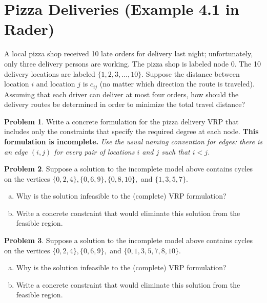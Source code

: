 \documentclass[11pt]{article}
\theoremstyle{definition}
\newtheorem{problem}{Problem}
\newcommand{\answerbox}[3]{%
  \fbox{%
    \begin{minipage}[#1]{#2}
      \hfill\vspace{#3}
    \end{minipage}
  }
}
\newcommand{\answerboxfull}[2]{%
  \answerbox{#1}{6.38in}{#2} 
}
\newcommand{\answerboxone}[2]{%
  \answerbox{#1}{6.0in}{#2} 
}
\begin{document}
\newpage

\section{Pizza Deliveries (Example 4.1 in Rader)}

A local pizza shop received 10 late orders for delivery last night; unfortunately,
only three delivery persons are working.  The pizza shop is labeled node 0.  The 10 delivery locations are labeled $\{1,2,3,\dots,10\}$.  Suppose the distance between location $i$ and location $j$ is $c_{ij}$ (no matter which direction the route is traveled).  Assuming that each driver can deliver at most four orders, how should the delivery
routes be determined in order to minimize the total travel distance?

\begin{problem}
Write a concrete formulation for the pizza delivery VRP that includes only the constraints that specify the required degree at each node.  \textbf{This formulation is incomplete.}  \emph{Use the usual  naming convention for edges:  there is an edge $(i,j)$ for every pair of locations $i$ and $j$ such that $i < j$.}

\answerboxfull{c}{8cm}
\end{problem}



\begin{problem}
Suppose a solution to the incomplete model above contains cycles on the vertices $\{0,2,4\}, \{0,6,9\}, \{0,8,10\},$ and $\{1,3,5,7\}$. 
\begin{enumerate}[(a)]
\item Why is the solution infeasible to the (complete) VRP formulation?  \\
\answerboxone{c}{0.4in}
\item Write a concrete constraint that would eliminate this solution from the feasible region.\\
\answerboxone{c}{1in}
\end{enumerate}
\end{problem}

\newpage
\begin{problem}
Suppose a solution to the incomplete model above contains cycles on the vertices $\{0,2,4\}, \{0,6,9\},$ and $\{0,1,3,5,7,8,10\}$. 
\begin{enumerate}[(a)]
\item Why is the solution infeasible to the (complete) VRP formulation?  \\
\answerboxone{c}{0.4in}
\item Write a concrete constraint that would eliminate this solution from the feasible region.\\
\answerboxone{c}{1in}
\end{enumerate}
\end{problem}
\end{document}
